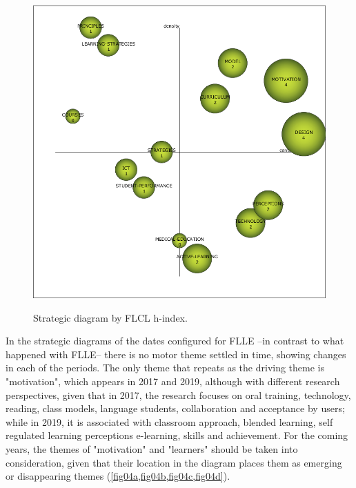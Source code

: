 \documentclass{textolivre}
\begin{document}
\begin{figure}[htbp]\ContinuedFloat
 \begin{minipage}{.45\textwidth}
 \includegraphics[width=\textwidth]{Fig03g.png}
 \label{fig03g}
 \end{minipage}
 \hfill
 \begin{minipage}{.45\textwidth}
  \hfill
 \end{minipage}
 \caption{Strategic diagram by FLCL h-index.}
 \label{fig03}
\end{figure}

In the strategic diagrams of the dates configured for FLLE –in contrast to what happened with FLLE– there is no motor theme settled in time, showing changes in each of the periods. The only theme that repeats as the driving theme is "motivation", which appears in 2017 and 2019, although with different research perspectives, given that in 2017, the research focuses on oral training, technology, reading, class models, language students, collaboration and acceptance by users; while in 2019, it is associated with classroom approach, blended learning, self regulated learning perceptions e-learning, skills and achievement. For the coming years, the themes of "motivation" and "learners" should be taken into consideration, given that their location in the diagram places them as emerging or disappearing themes (\cref{fig04a,fig04b,fig04c,fig04d}).
\end{document}
